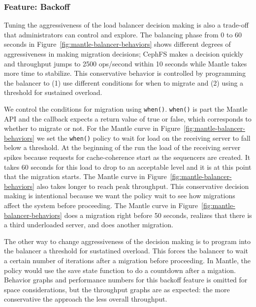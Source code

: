 \documentclass[preprint]{sigplanconf-eurosys}
\begin{document}
\subsubsection{Feature: Backoff}
\label{sec:feature-backoff}

Tuning the aggressiveness of the load balancer decision making is also a
trade-off that administrators can control and explore. The balancing phase from
0 to 60 seconds in Figure~\ref{fig:mantle-balancer-behaviors} shows different
degrees of aggressiveness in making migration decisions; CephFS makes a
decision quickly and throughput jumps to 2500 ops/second within 10 seconds
while Mantle takes more time to stabilize. This conservative behavior is
controlled by programming the balancer to (1) use different conditions for when
to migrate and (2) using a threshold for sustained overload. 

We control the conditions for migration using \texttt{when()}. \texttt{when()}
is part the Mantle API and the callback expects a return value of true or
false, which corresponds to whether to migrate or not. For the Mantle curve in
Figure~\ref{fig:mantle-balancer-behaviors} we set the \texttt{when()} policy to
wait for load on the receiving server to fall below a threshold. At the
beginning of the run the load of the receiving server spikes because requests
for cache-coherence start as the sequencers are created. It takes 60 seconds
for this load to drop to an acceptable level and it is at this point that the
migration starts.  The Mantle curve in
Figure~\ref{fig:mantle-balancer-behaviors} also takes longer to reach peak
throughput.  This conservative decision making is intentional because we want
the policy wait to see how migrations affect the system before proceeding. The
Mantle curve in Figure~\ref{fig:mantle-balancer-behaviors} does a migration
right before 50 seconds, realizes that there is a third underloaded server, and
does another migration. 

The other way to change aggressiveness of the decision making is to program
into the balancer a threshold for sustatined overload. This forces the balancer
to wait a certain number of iterations after a migration before proceeding. In
Mantle, the policy would use the save state function to do a countdown after a
migation.  Behavior graphs and performance numbers for this backoff feature is
omitted for space considerations, but the throughput graphs are as expected:
the more conservative the approach the less overall throughput.\\
 
\end{document}
